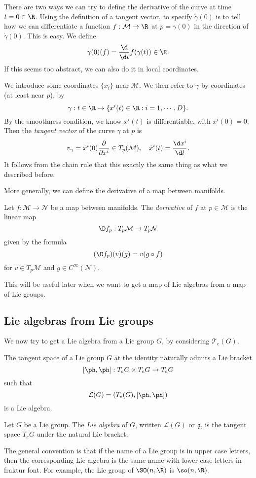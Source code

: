 \documentclass[a4paper]{article}
\begin{document}
There are two ways we can try to define the derivative of the curve at time $t = 0 \in \R$. Using the definition of a tangent vector, to specify $\dot{\gamma}(0)$ is to tell how we can differentiate a function $f: \mathcal{M} \to \R$ at $p = \gamma(0)$ in the direction of $\dot{\gamma}(0)$. This is easy. We define
\[
  \dot{\gamma}(0)(f) = \frac{\d}{\d t} f(\gamma(t)) \in \R.
\]
If this seems too abstract, we can also do it in local coordinates.

We introduce some coordinates $\{x_i\}$ near $\mathcal{M}$. We then refer to $\gamma$ by coordinates (at least near $p$), by
\[
  \gamma: t \in \R \mapsto \{x^i(t) \in \R: i = 1, \cdots, D\}.
\]
By the smoothness condition, we know $x^i(t)$ is differentiable, with $x^i(0) = 0$. Then the \emph{tangent vector} of the curve $\gamma$ at $p$ is
\[
  v_\gamma = \dot{x}^i(0) \frac{\partial}{\partial x^i} \in T_p (\mathcal{M}),\quad \dot{x}^i(t) = \frac{\d x^i}{\d t}.
\]
It follows from the chain rule that this exactly the same thing as what we described before.

More generally, we can define the derivative of a map between manifolds.
\begin{defi}[Derivative]
  Let $f: \mathcal{M} \to \mathcal{N}$ be a map between manifolds. The \emph{derivative} of $f$ at $p \in \mathcal{M}$ is the linear map
  \[
    \D f_p: T_p \mathcal{M} \to T_p \mathcal{N}
  \]
  given by the formula
  \[
    (\D f_p)(v)(g) = v(g \circ f)
  \]
  for $v \in T_p \mathcal{M}$ and $g \in C^\infty(\mathcal{N})$.
\end{defi}
This will be useful later when we want to get a map of Lie algebras from a map of Lie groups.

\subsection{Lie algebras from Lie groups}
We now try to get a Lie algebra from a Lie group $G$, by considering $\mathcal{T}_e(G)$.

\begin{thm}
  The tangent space of a Lie group $G$ at the identity naturally admits a Lie bracket
  \[
    [\ph, \ph]: T_e G \times T_e G \to T_e G
  \]
  such that
  \[
    \mathcal{L}(G) = (T_e(G), [\ph, \ph])
  \]
  is a Lie algebra.
\end{thm}

\begin{defi}
  Let $G$ be a Lie group. The \emph{Lie algebra} of $G$, written $\mathcal{L}(G)$ or $\mathfrak{g}$, is the tangent space $T_e G$ under the natural Lie bracket.
\end{defi}
The general convention is that if the name of a Lie group is in upper case letters, then the corresponding Lie algebra is the same name with lower case letters in fraktur font. For example, the Lie group of $\SO(n, \R)$ is $\so(n, \R)$.
\end{document}
